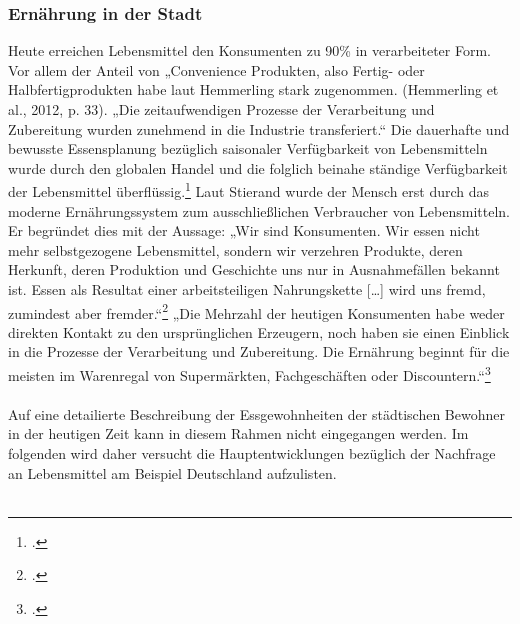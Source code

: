 \documentclass{scrartcl}
\begin{document}
\subsubsection {Ernährung in der Stadt} \label{StadtLebensmittel}
Heute erreichen Lebensmittel den Konsumenten zu 90\% in verarbeiteter Form. Vor allem der Anteil von „Convenience Produkten, also Fertig- oder Halbfertigprodukten habe laut Hemmerling stark zugenommen. (Hemmerling et al., 2012, p. 33). „Die zeitaufwendigen Prozesse der Verarbeitung und Zubereitung wurden zunehmend in die Industrie transferiert.“  
Die dauerhafte und bewusste Essensplanung bezüglich saisonaler Verfügbarkeit von Lebensmitteln wurde durch den globalen Handel und die folglich beinahe ständige Verfügbarkeit der Lebensmittel überflüssig.\footcite[Vgl.][S.20]{SchmidtDieVon}
Laut Stierand wurde der Mensch erst durch das moderne Ernährungssystem zum ausschließlichen Verbraucher von Lebensmitteln. Er begründet dies mit der Aussage: „Wir sind Konsumenten. Wir essen nicht mehr selbstgezogene Lebensmittel, sondern wir verzehren Produkte, deren Herkunft, deren Produktion und Geschichte uns nur in Ausnahmefällen bekannt ist. Essen als Resultat einer arbeitsteiligen Nahrungskette […] wird uns fremd, zumindest aber fremder.“\footcite{Spiekermann2000GesundeKulturwissenschaft} 
„Die Mehrzahl der heutigen Konsumenten habe weder direkten Kontakt zu den ursprünglichen Erzeugern, noch haben sie einen Einblick in die Prozesse der Verarbeitung und Zubereitung.
Die Ernährung beginnt für die meisten im Warenregal von Supermärkten, Fachgeschäften oder Discountern.“\footcites[S.20]{SchmidtDieVon}[Vgl.]{BerichtInhalt}\\
\\
 Auf eine detailierte Beschreibung der Essgewohnheiten der städtischen Bewohner in der heutigen Zeit kann in diesem Rahmen nicht eingegangen werden. Im folgenden wird daher versucht die Hauptentwicklungen bezüglich der Nachfrage an Lebensmittel am Beispiel Deutschland aufzulisten.\\
 \\
\end{document}
